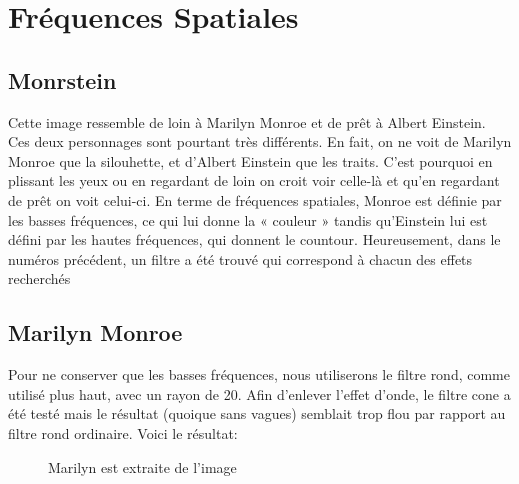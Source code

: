 \documentclass[12pt]{article}
\begin{document}
\pagebreak
\section{Fréquences Spatiales}
\subsection{Monrstein}
Cette image ressemble de loin à Marilyn Monroe et de prêt à Albert Einstein. Ces deux personnages sont pourtant très différents. En fait, on ne voit de Marilyn Monroe que la silouhette, et d'Albert Einstein que les traits. C'est pourquoi en plissant les yeux ou en regardant de loin on croit voir celle-là et qu'en regardant de prêt on voit celui-ci. En terme de fréquences spatiales, Monroe est définie par les basses fréquences, ce qui lui donne la « couleur » tandis qu'Einstein lui est défini par les hautes fréquences, qui donnent le countour. Heureusement, dans le numéros précédent, un filtre a été trouvé qui correspond à chacun des effets recherchés

\subsection{Marilyn Monroe}
Pour ne conserver que les basses fréquences, nous utiliserons le filtre rond, comme utilisé plus haut, avec un rayon de 20. Afin d'enlever l'effet d'onde, le filtre cone a été testé mais le résultat (quoique sans vagues) semblait trop flou par rapport au filtre rond ordinaire. Voici le résultat:
\vspace{3cm}
\begin{figure}[ht]
  \centering
  \captionsetup{width=.8\linewidth}
  \caption{Marilyn est extraite de l'image}
\end{figure}

\pagebreak
\end{document}
